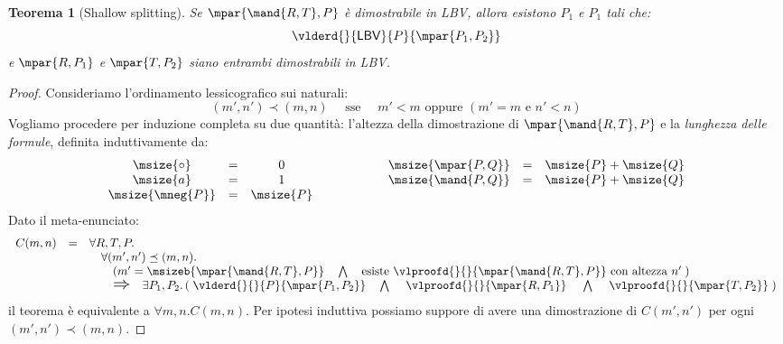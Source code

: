 \documentclass[12pt,a4paper,openright,twoside]{report}
\newtheorem{thm}{Teorema}[section]
\begin{document}
\begin{thm}[Shallow splitting]\label{thm:shallow_split}
Se $\mpar{\mand{R,T},P}$ \`e dimostrabile in \textsf{LBV}, allora esistono $P_1$ e $P_1$ tali che:
$$
	\vlderd{}{\mathsf{LBV}}{P}{\mpar{P_1,P_2}}
$$
e $\mpar{R,P_1}$ e $\mpar{T,P_2}$ siano entrambi dimostrabili in \textsf{LBV}.
\end{thm}
\begin{proof}
Consideriamo l'ordinamento lessicografico sui naturali:
$$
	(m', n') \prec (m, n) \quad\mbox{ sse }\quad m' < m \mbox{ oppure } (m' = m \mbox{ e } n' < n)
$$
Vogliamo procedere per induzione completa su due quantit\`a: l'altezza della dimostrazione di $\mpar{\mand{R,T},P}$ e la \emph{lunghezza delle formule}, definita induttivamente da:
$$
	\begin{array}{ccccccc}
		\msize{\circ} & = & 0 & \qquad\qquad & \msize{\mpar{P,Q}} & = & \msize{P} + \msize{Q} \\
		\msize{a} & = & 1 & \qquad\qquad & \msize{\mand{P,Q}} & = & \msize{P} + \msize{Q} \\
		\msize{\mneg{P}} & = & \msize{P}
	\end{array}
$$
Dato il meta-enunciato:
$$
\begin{array}{lll}
	C(m,n) & = & \forall R,T,P. \\
	& ~ &\quad \forall (m',n') \preceq (m,n). \\
	~ & ~ &\quad\quad \left(m' = \msizeb{\mpar{\mand{R,T},P}} \quad\bigwedge\quad \mbox{esiste } \vlproofd{}{}{\mpar{\mand{R,T},P}} \mbox{ con altezza $n'$}\;\right) \\
	~ & ~ &\quad\quad \mbox{\scalebox{1.5}{$\Rightarrow$}}\quad \exists P_1,P_2.\left(\;\vlderd{}{}{P}{\mpar{P_1,P_2}} \quad\bigwedge\:\quad \vlproofd{}{}{\mpar{R,P_1}} \:\quad\bigwedge\:\quad \vlproofd{}{}{\mpar{T,P_2}} \;\right)
\end{array}
$$
il teorema \`e equivalente a $\forall m,n.C(m,n)$. Per ipotesi induttiva possiamo suppore di avere una dimostrazione di $C(m',n')$ per ogni $(m',n') \prec (m,n)$.


\end{proof}
\end{document}
